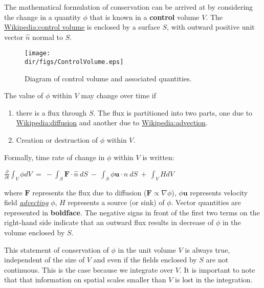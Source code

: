 The mathematical formulation of conservation can be arrived at by
considering the change in a quantity $\phi$ that is known in a
\textbf{control} volume $V$. The
\href{Wikipedia:control volume}{Wikipedia:control volume} is enclosed by
a surface $S$, with outward positive unit vector $\hat n$ normal to $S$.


\begin{figure}
  \begin{center}
    \texttt{[image: \\dir/figs/ControlVolume.eps]}
  \end{center}
  \caption{Diagram of control volume and associated quantities.}
  \label{fig:controlvol}
\end{figure} 


The value of $\phi$ within $V$ may change over time if

\begin{enumerate}
\itemsep1pt\parskip0pt
\item
  there is a flux through $S$. The flux is partitioned into two parts,
  one due to \url{Wikipedia:diffusion} and another due to
  \url{Wikipedia:advection}.
\item
  Creation or destruction of $\phi$ within $V$.
\end{enumerate}

Formally, time rate of change in $\phi$ within $V$ is written:

$
{\frac{ \partial }{ \partial t}} { \int }_{ V} \phi dV~ = ~ -{ \int }_{ S} {\mathbf F}
    {\cdot} \hat n~ dS~ - ~{ \int }_{ S} \phi {\mathbf u} {\cdot} \hat n ~ dS~
    + ~{ \int }_{ V} HdV
$

where ${\mathbf F}$ represents the flux due to diffusion
($\mathbf{F} \propto \nabla \phi$), $\phi {\mathbf u}$ represents
velocity field \emph{\href{Wikipedia:advection}{advecting}} $\phi$, $H$
represents a source (or sink) of $\phi$. Vector quantities are
represented in \textbf{boldface}. The negative signs in front of the
first two terms on the right-hand side indicate that an outward flux
results in decrease of $\phi$ in the volume enclosed by $S$.

This statement of conservation of $\phi$ in the unit volume $V$ is
always true, independent of the size of $V$ and even if the fields
enclosed by $S$ are not continuous. This is the case because we
integrate over $V$. It is important to note that that information on
spatial scales smaller than $V$ is lost in the integration.

